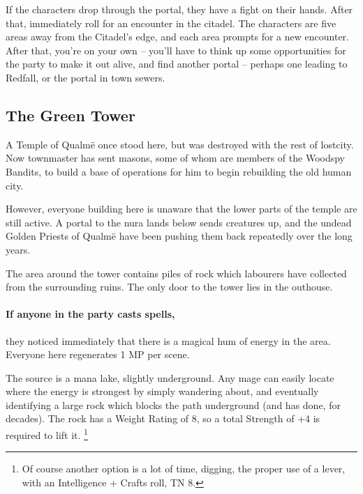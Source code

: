\begin{multicols}{2}
If the characters drop through the portal, they have a fight on their hands.
After that, immediately roll for an encounter in the citadel.
The characters are five areas away from the Citadel's edge, and each area prompts for a new encounter.
After that, you're on your own -- you'll have to think up some opportunities for the party to make it out alive, and find another portal -- perhaps one leading to Redfall, or the portal in \gls{town} sewers.

\subsection{The Green Tower}\label{green_tower}\setcounter{list}{0}


A Temple of Qualm\"{e} once stood here, but was destroyed with the rest of \gls{lostcity}.
Now \gls{townmaster} has sent masons, some of whom are members of the Woodspy Bandits, to build a base of operations for him to begin rebuilding the old human city.

However, everyone building here is unaware that the lower parts of the temple are still active.
A portal to the nura lands below sends creatures up, and the undead Golden Priests of Qualm\"{e} have been pushing them back repeatedly over the long years.


The area around the tower contains piles of rock which labourers have collected from the surrounding ruins.  The only door to the tower lies in the outhouse.

\paragraph{If anyone in the party casts spells,}
they noticed immediately that there is a magical hum of energy in the area.
Everyone here regenerates 1 MP per scene.

The source is a mana lake, slightly underground.
Any mage can easily locate where the energy is strongest by simply wandering about, and eventually identifying a large rock which blocks the path underground (and has done, for decades).
The rock has a Weight Rating of 8, so a total Strength of +4 is required to lift it.%
\footnote{Of course another option is a lot of time, digging, the proper use of a lever, with an Intelligence + Crafts roll, TN 8.}



\end{multicols}
